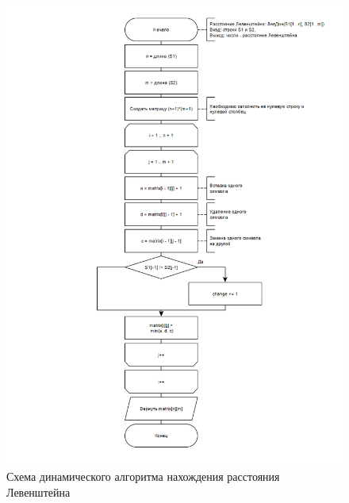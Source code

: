 \begin{figure}[h]
	\centering
	\includegraphics[scale=0.6]{images/lev_dyn.png}
	\caption{Схема динамического алгоритма нахождения расстояния Левенштейна}
	\label{fig:L_table}
\end{figure}

\clearpage


